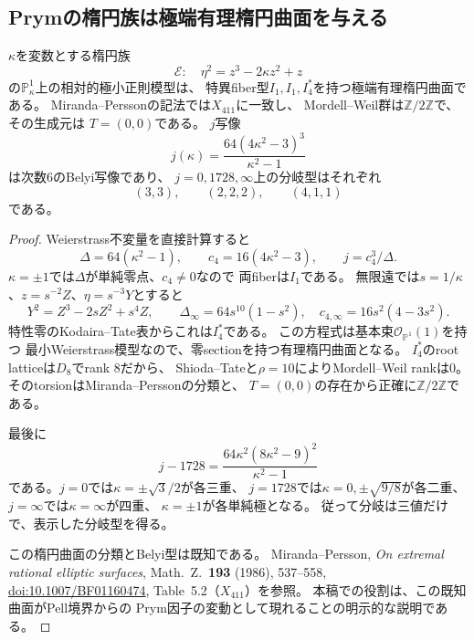 \subsection{Prymの楕円族は極端有理楕円曲面を与える}
\begin{proposition}
\label{prop:prym-extremal-X411}
$\kappa$を変数とする楕円族
\[
 \mathscr E:\quad \eta^2=z^3-2\kappa z^2+z
\]
の$\mathbb P^1_\kappa$上の相対的極小正則模型は、
特異fiber型$I_1,I_1,I_4^*$を持つ極端有理楕円曲面である。
Miranda--Perssonの記法では$X_{411}$に一致し、
Mordell--Weil群は$\mathbb Z/2\mathbb Z$で、その生成元は
$T=(0,0)$である。
$j$写像
\begin{equation}\label{eq:prym-belyi-j}
 j(\kappa)=\frac{64(4\kappa^2-3)^3}{\kappa^2-1}
\end{equation}
は次数$6$のBelyi写像であり、
$j=0,1728,\infty$上の分岐型はそれぞれ
\[
 (3,3),\qquad(2,2,2),\qquad(4,1,1)
\]
である。
\end{proposition}
\begin{proof}
Weierstrass不変量を直接計算すると
\[
 \Delta=64(\kappa^2-1),\qquad
 c_4=16(4\kappa^2-3),\qquad j=c_4^3/\Delta.
\]
$\kappa=\pm1$では$\Delta$が単純零点、$c_4\ne0$なので
両fiberは$I_1$である。
無限遠では$s=1/\kappa$、$z=s^{-2}Z$、$\eta=s^{-3}Y$とすると
\[
 Y^2=Z^3-2sZ^2+s^4Z,\qquad
 \Delta_\infty=64s^{10}(1-s^2),\quad
 c_{4,\infty}=16s^2(4-3s^2).
\]
特性零のKodaira--Tate表からこれは$I_4^*$である。
この方程式は基本束$\mathcal O_{\mathbb P^1}(1)$を持つ
最小Weierstrass模型なので、零sectionを持つ有理楕円曲面となる。
$I_4^*$のroot latticeは$D_8$でrank $8$だから、
Shioda--Tateと$\rho=10$によりMordell--Weil rankは$0$。
そのtorsionはMiranda--Perssonの分類と、
$T=(0,0)$の存在から正確に$\mathbb Z/2\mathbb Z$である。

最後に
\[
 j-1728=
 \frac{64\kappa^2(8\kappa^2-9)^2}{\kappa^2-1}
\]
である。$j=0$では$\kappa=\pm\sqrt3/2$が各三重、
$j=1728$では$\kappa=0,\pm\sqrt{9/8}$が各二重、
$j=\infty$では$\kappa=\infty$が四重、
$\kappa=\pm1$が各単純極となる。
従って分岐は三値だけで、表示した分岐型を得る。

この楕円曲面の分類とBelyi型は既知である。
Miranda--Persson,
\emph{On extremal rational elliptic surfaces},
Math.\ Z.\ \textbf{193} (1986), 537--558,
\href{https://doi.org/10.1007/BF01160474}{doi:10.1007/BF01160474},
Table~5.2（$X_{411}$）を参照。
本稿での役割は、この既知曲面がPell境界からの
Prym因子の変動として現れることの明示的な説明である。
\end{proof}


